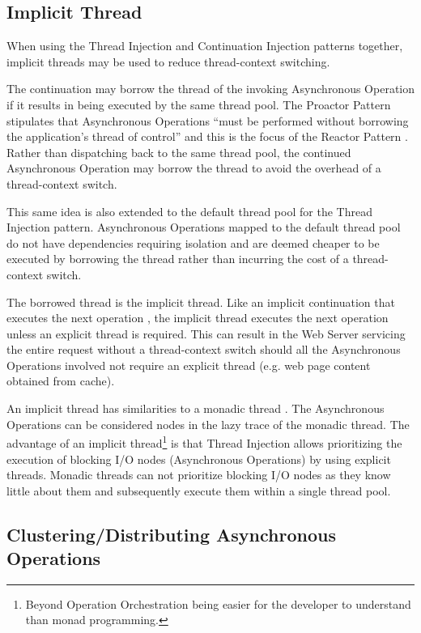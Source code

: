 \documentclass[prodmode]{style/acmlarge}
\begin{document}
\subsection{Implicit Thread}

When using the Thread Injection and Continuation Injection patterns together,
implicit threads may be used to reduce thread-context switching.

The continuation may borrow the thread of the invoking Asynchronous Operation if
it results in being executed by the same thread pool.  The Proactor Pattern
stipulates that Asynchronous Operations ``must be performed without borrowing
the application's thread of control'' \cite[p. 8]{proactor} and this is the
focus of the Reactor Pattern \cite{reactor}.  Rather than dispatching back to
the same thread pool, the continued Asynchronous Operation may borrow the thread
to avoid the overhead of a thread-context switch.

This same idea is also extended to the default thread pool for the Thread
Injection pattern.  Asynchronous Operations mapped to the default thread pool do
not have dependencies requiring isolation and are deemed cheaper to be executed
by borrowing the thread rather than incurring the cost of a thread-context
switch.

The borrowed thread is the implicit thread.  Like an implicit continuation that
executes the next operation \cite{continuations}, the implicit thread executes
the next operation unless an explicit thread is required.  This can result in
the Web Server servicing the entire request without a thread-context switch
should all the Asynchronous Operations involved not require an explicit thread
(e.g. web page content obtained from cache).

An implicit thread has similarities to a monadic thread \cite{monadic-thread}.
The Asynchronous Operations can be considered nodes in the lazy trace of the
monadic thread.  The advantage of an implicit thread\footnote{Beyond Operation
Orchestration being easier for the developer to understand than monad
programming.} is that Thread Injection allows prioritizing the execution of
blocking I/O nodes (Asynchronous Operations) by using explicit threads.  Monadic
threads can not prioritize blocking I/O nodes as they know little about them and
subsequently execute them within a single thread pool.


\subsection{Clustering/Distributing Asynchronous Operations}
\end{document}
